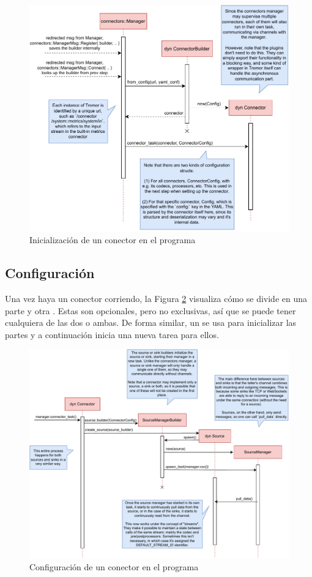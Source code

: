 \begin{figure}
    \centering
    \includegraphics[width=\textwidth]{./Imagenes/initializing.pdf}
    \caption{Inicialización de un conector en el programa}%
    \label{fig:tremor_initializing}
\end{figure}

\subsection{Configuración}

Una vez haya un conector corriendo, la Figura \ref{fig:tremor_setting_up}
visualiza cómo se divide en una parte \sink y otra \source. Estas son
opcionales, pero no exclusivas, así que se puede tener cualquiera de las dos o
ambas. De forma similar, un \builder se usa para inicializar las partes y a
continuación inicia una nueva tarea para ellos.

\begin{figure}
    \centering
    \includegraphics[width=\textwidth]{./Imagenes/setting-up.pdf}
    \caption{Configuración de un conector en el programa}%
    \label{fig:tremor_setting_up}
\end{figure}

